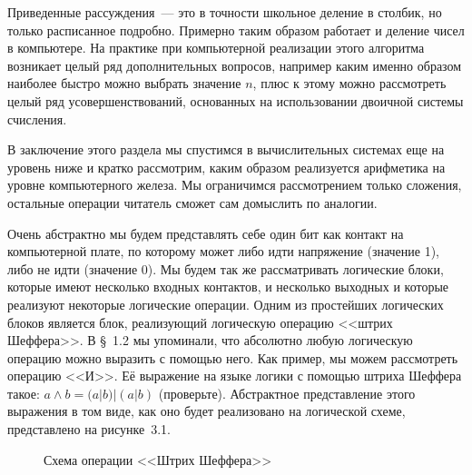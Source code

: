 Приведенные рассуждения~--- это в точности школьное деление в столбик, но только расписанное подробно. Примерно таким образом работает и деление чисел в компьютере. На практике при компьютерной реализации этого алгоритма возникает целый ряд дополнительных вопросов, например каким именно образом наиболее быстро можно выбрать значение $n$, плюс к этому можно рассмотреть целый ряд усовершенствований, основанных на использовании двоичной системы счисления.

В заключение этого раздела мы спустимся в вычислительных системах еще на уровень ниже и кратко рассмотрим, каким образом реализуется арифметика на уровне компьютерного железа. Мы ограничимся рассмотрением только сложения, остальные операции читатель сможет сам домыслить по аналогии.

Очень абстрактно мы будем представлять себе один бит как контакт на компьютерной плате, по которому может либо идти напряжение (значение 1), либо не идти (значение 0). Мы будем так же рассматривать логические блоки, которые имеют несколько входных контактов, и несколько выходных и которые реализуют некоторые логические операции. Одним из простейших логических блоков является блок, реализующий логическую операцию <<штрих Шеффера>>. В \S~1.2 мы упоминали, что абсолютно любую логическую операцию можно выразить с помощью него. Как пример, мы можем рассмотреть операцию <<И>>. Её выражение на языке логики с помощью штриха Шеффера такое: $a\land b = (a|b)|(a|b)$ (проверьте). Абстрактное представление этого выражения в том виде, как оно будет реализовано на логической схеме, представлено на рисунке~3.1.
\begin{figure}[h]
\centering
{}
\caption{Схема операции <<Штрих Шеффера>>}
\end{figure}

